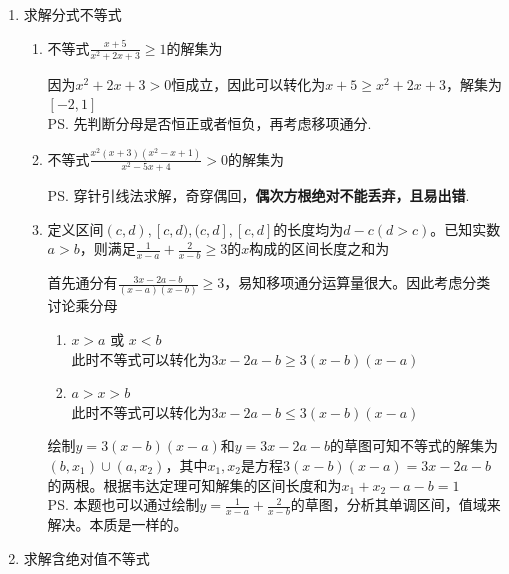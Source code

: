 \begin{enumerate}
\begin{enumerate}
\begin{jieda}
            $(x-2)(x-3) \leq 0$解集为$[2, 3]$ \\
            $|x-2|+|x-3| = 1$解集为$[2, 3]$（平底锅函数，三角不等式）
        \end{jieda}
    \end{enumerate}
    \item 求解分式不等式
    \begin{enumerate}
        \item 不等式$\frac{x+5}{x^2+2x+3} \geq 1$的解集为\blkda{$[-2, 1]$}
        \begin{jieda}
            因为$x^2+2x+3 > 0$恒成立，因此可以转化为$x+5 \geq x^2+2x+3$，解集为$[-2, 1]$ \\
            \ps 先判断分母是否恒正或者恒负，再考虑移项通分.
        \end{jieda}
        \item 不等式$\frac{x^2(x+3)(x^2-x+1)}{x^2 - 5x + 4} > 0$的解集为
        \begin{jieda}
            \ps 穿针引线法求解，奇穿偶回，\textbf{偶次方根绝对不能丢弃，且易出错}.
        \end{jieda}
        \item 定义区间$(c, d), [c, d), (c, d], [c, d]$的长度均为$d-c (d>c)$。已知实数$a > b$，则满足$\frac{1}{x-a} + \frac{2}{x-b} \geq 3$的$x$构成的区间长度之和为
        \begin{jieda}
            首先通分有$\frac{3x-2a-b}{(x-a)(x-b)} \geq 3$，易知移项通分运算量很大。因此考虑分类讨论乘分母
            \begin{enumerate}
                \item $x > a$ 或 $x < b$ \\
                此时不等式可以转化为$3x-2a-b \geq 3(x-b)(x-a)$
                \item $a > x > b$ \\
                此时不等式可以转化为$3x-2a-b \leq 3(x-b)(x-a)$
            \end{enumerate}
            绘制$y = 3(x-b)(x-a)$和$y = 3x-2a-b$的草图可知不等式的解集为$(b, x_1) \cup (a, x_2)$，其中$x_1, x_2$是方程$3(x-b)(x-a) = 3x-2a-b$的两根。根据韦达定理可知解集的区间长度和为$x_1 + x_2 - a - b = 1$ \\
            \ps 本题也可以通过绘制$y = \frac{1}{x-a} + \frac{2}{x-b}$的草图，分析其单调区间，值域来解决。本质是一样的。
        \end{jieda}
    \end{enumerate}
    \item 求解含绝对值不等式

\end{enumerate}

